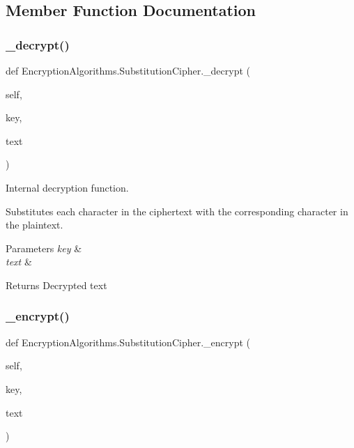 \subsection{Member Function Documentation}
\mbox{\label{classEncryptionAlgorithms_1_1SubstitutionCipher_ac7b54cd92d6d1c1cb5a90a9c603d50c1}} 
\subsubsection{\texorpdfstring{\+\_\+decrypt()}{\_decrypt()}}
{\footnotesize\ttfamily def Encryption\+Algorithms.\+Substitution\+Cipher.\+\_\+decrypt (\begin{DoxyParamCaption}\item[{}]{self,  }\item[{}]{key,  }\item[{}]{text }\end{DoxyParamCaption})\hspace{0.3cm}{\ttfamily [private]}}



Internal decryption function. 

Substitutes each character in the ciphertext with the corresponding character in the plaintext.


\begin{DoxyParams}{Parameters}
{\em key} & \\
\hline
{\em text} & \\
\hline
\end{DoxyParams}
\begin{DoxyReturn}{Returns}
Decrypted text 
\end{DoxyReturn}
\mbox{\label{classEncryptionAlgorithms_1_1SubstitutionCipher_ae877efaf2ea953c760770d92d719517a}} 
\subsubsection{\texorpdfstring{\+\_\+encrypt()}{\_encrypt()}}
{\footnotesize\ttfamily def Encryption\+Algorithms.\+Substitution\+Cipher.\+\_\+encrypt (\begin{DoxyParamCaption}\item[{}]{self,  }\item[{}]{key,  }\item[{}]{text }\end{DoxyParamCaption})\hspace{0.3cm}{\ttfamily [private]}}



